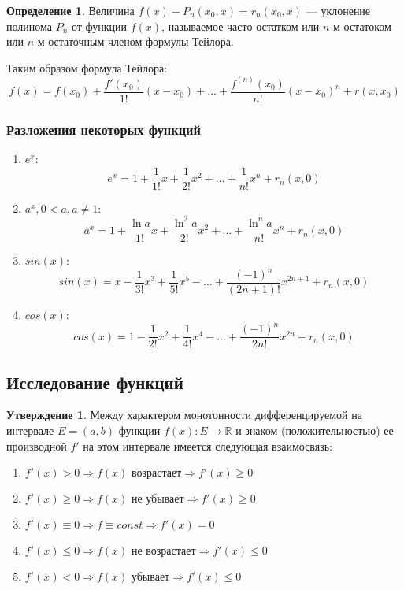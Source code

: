 \documentclass[12pt]{report}
\theoremstyle{definition}
\newtheorem{definition}[theorem]{Определение}
\newtheorem{statement}[theorem]{Утверждение}
\newcommand{\R}{\mathbb R}
\begin{document}
\begin{definition}
Величина $f(x) - P_n(x_0, x) = r_n(x_0, x)$ --- уклонение
полинома $P_n$ от функции $f(x)$, называемое часто остатком
или $n$-м остатоком или $n$-м остаточным членом формулы Тейлора.
\end{definition}

Таким образом формула Тейлора:
$$
f(x) = f(x_0) + \dfrac{f'(x_0)}{1!}(x - x_0)+ \dots + 
\dfrac{f^{(n)}(x_0)}{n!} (x - x_0)^n + r(x, x_0)
$$

\subsubsection{Разложения некоторых функций}
\begin{enumerate}
\item $e^x$:
  $$
    e^x = 1 + \dfrac{1}{1!} x + \dfrac{1}{2!} x^2 + \dots + \dfrac{1}{n!} x^n + r_n(x, 0)
  $$
\item $a^x, 0 < a, a \ne 1$:
  $$
    a^x = 1 + \dfrac{\ln a}{1!} x + \dfrac{\ln^2 a}{2!} x^2 + \dots + \dfrac{\ln^n a}{n!} x^n + r_n(x, 0)
  $$
\item $sin(x)$:
  $$
    sin(x) = x - \dfrac{1}{3!} x^3 + \dfrac{1}{5!} x^5 - \dots + \dfrac{(-1)^n}{(2n + 1)!} x^{2n+1} + r_n(x, 0)
  $$
\item $cos(x)$:
  $$
    cos(x) = 1 - \dfrac{1}{2!} x^2 + \dfrac{1}{4!} x^4 - \dots + \dfrac{(-1)^n}{2n!} x^{2n} + r_n(x, 0)
  $$
\end{enumerate}

\subsection{Исследование функций}
\begin{statement}
Между характером монотонности дифференцируемой на интервале $E = (a, b)$
функции $f(x): E \rightarrow \R$ и знаком (положительностью) ее производной
$f'$ на этом интервале имеется следующая взаимосвязь:
\begin{enumerate}
\item $f'(x) > 0 \Rightarrow f(x) \text{ возрастает} \Rightarrow f'(x) \ge 0$
\item $f'(x) \ge 0 \Rightarrow f(x) \text{ не убывает} \Rightarrow f'(x) \ge 0$
\item $f'(x) \equiv 0 \Rightarrow f \equiv const \Rightarrow f'(x) = 0$
\item $f'(x) \le 0 \Rightarrow f(x) \text{ не возрастает} \Rightarrow f'(x) \le 0$
\item $f'(x) < 0 \Rightarrow f(x) \text{ убывает} \Rightarrow f'(x) \le 0$
\end{enumerate}
\end{statement}
\end{document}
